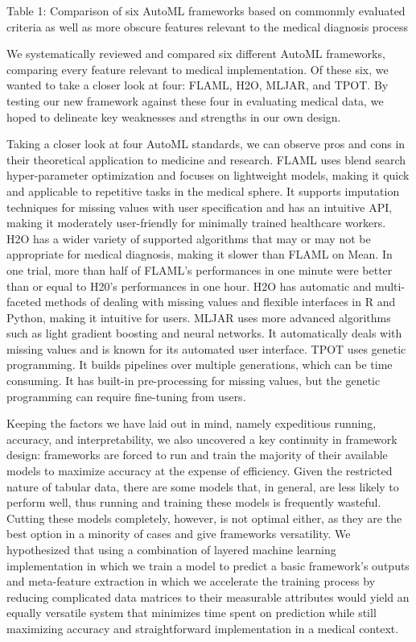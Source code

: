 \documentclass{article}
\begin{document}
Table 1: Comparison of six AutoML frameworks based on commonmly evaluated criteria as well as more obscure features relevant to the medical diagnosis process 

We systematically reviewed and compared six different AutoML frameworks, comparing every feature relevant to medical implementation. Of these six, we wanted to take a closer look at four: FLAML, H2O, MLJAR, and TPOT. By testing our new framework against these four in evaluating medical data, we hoped to delineate key weaknesses and strengths in our own design. 

Taking a closer look at four AutoML standards, we can observe pros and cons in their theoretical application to medicine and research. FLAML uses blend search hyper-parameter optimization and focuses on lightweight models, making it quick and applicable to repetitive tasks in the medical sphere. It supports imputation techniques for missing values with user specification and has an intuitive API, making it moderately user-friendly for minimally trained healthcare workers. H2O has a wider variety of supported algorithms that may or may not be appropriate for medical diagnosis, making it slower than FLAML on Mean. In one trial, more than half of FLAML's performances in one minute were better than or equal to H20's performances in one hour. H2O has automatic and multi-faceted methods of dealing with missing values and flexible interfaces in R and Python, making it intuitive for users. MLJAR uses more advanced algorithms such as light gradient boosting and neural networks. It automatically deals with missing values and is known for its automated user interface. TPOT uses genetic programming. It builds pipelines over multiple generations, which can be time consuming. It has built-in pre-processing for missing values, but the genetic programming can require fine-tuning from users. 

Keeping the factors we have laid out in mind, namely expeditious running, accuracy, and interpretability, we also uncovered a key continuity in framework design: frameworks are forced to run and train the majority of their available models to maximize accuracy at the expense of efficiency. Given the restricted nature of tabular data, there are some models that, in general, are less likely to perform well, thus running and training these models is frequently wasteful. Cutting these models completely, however, is not optimal either, as they are the best option in a minority of cases and give frameworks versatility. We hypothesized that using a combination of layered machine learning implementation in which we train a model to predict a basic framework's outputs and meta-feature extraction in which we accelerate the training process by reducing complicated data matrices to their measurable attributes would yield an equally versatile system that minimizes time spent on prediction while still maximizing accuracy and straightforward implementation in a medical context. 
\end{document}
